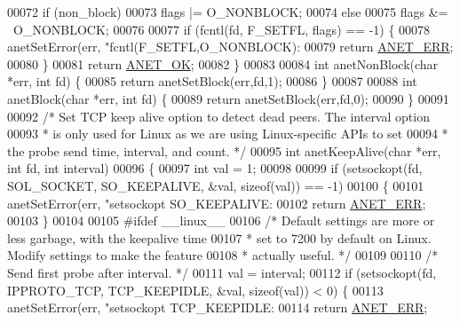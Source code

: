 \begin{DoxyCode}
{00072     \textcolor{keywordflow}{if} (non\_block)
00073         flags |= O\_NONBLOCK;
00074     \textcolor{keywordflow}{else}
00075         flags &= ~O\_NONBLOCK;
00076 
00077     \textcolor{keywordflow}{if} (fcntl(fd, F\_SETFL, flags) == -1) \{
00078         anetSetError(err, \textcolor{stringliteral}{"fcntl(F\_SETFL,O\_NONBLOCK): %
00079         \textcolor{keywordflow}{return} \hyperlink{anet_8h_a0697b7774a7e0f4ef141839fe93536fe}{ANET\_ERR};
00080     \}
00081     \textcolor{keywordflow}{return} \hyperlink{anet_8h_a25fb91ccc6457153f6d2e21380d4c6cf}{ANET\_OK};
00082 \}
00083 
00084 \textcolor{keywordtype}{int} anetNonBlock(\textcolor{keywordtype}{char} *err, \textcolor{keywordtype}{int} fd) \{
00085     \textcolor{keywordflow}{return} anetSetBlock(err,fd,1);
00086 \}
00087 
00088 \textcolor{keywordtype}{int} anetBlock(\textcolor{keywordtype}{char} *err, \textcolor{keywordtype}{int} fd) \{
00089     \textcolor{keywordflow}{return} anetSetBlock(err,fd,0);
00090 \}
00091 
00092 \textcolor{comment}{/* Set TCP keep alive option to detect dead peers. The interval option}
00093 \textcolor{comment}{ * is only used for Linux as we are using Linux-specific APIs to set}
00094 \textcolor{comment}{ * the probe send time, interval, and count. */}
00095 \textcolor{keywordtype}{int} anetKeepAlive(\textcolor{keywordtype}{char} *err, \textcolor{keywordtype}{int} fd, \textcolor{keywordtype}{int} interval)
00096 \{
00097     \textcolor{keywordtype}{int} val = 1;
00098 
00099     \textcolor{keywordflow}{if} (setsockopt(fd, SOL\_SOCKET, SO\_KEEPALIVE, &val, \textcolor{keyword}{sizeof}(val)) == -1)
00100     \{
00101         anetSetError(err, \textcolor{stringliteral}{"setsockopt SO\_KEEPALIVE: %
00102         \textcolor{keywordflow}{return} \hyperlink{anet_8h_a0697b7774a7e0f4ef141839fe93536fe}{ANET\_ERR};
00103     \}
00104 
00105 \textcolor{preprocessor}{#}\textcolor{preprocessor}{ifdef} \_\_linux\_\_
00106     \textcolor{comment}{/* Default settings are more or less garbage, with the keepalive time}
00107 \textcolor{comment}{     * set to 7200 by default on Linux. Modify settings to make the feature}
00108 \textcolor{comment}{     * actually useful. */}
00109 
00110     \textcolor{comment}{/* Send first probe after interval. */}
00111     val = interval;
00112     \textcolor{keywordflow}{if} (setsockopt(fd, IPPROTO\_TCP, TCP\_KEEPIDLE, &val, \textcolor{keyword}{sizeof}(val)) < 0) \{
00113         anetSetError(err, \textcolor{stringliteral}{"setsockopt TCP\_KEEPIDLE: %
00114         \textcolor{keywordflow}{return} \hyperlink{anet_8h_a0697b7774a7e0f4ef141839fe93536fe}{ANET\_ERR};
}}}}
\end{DoxyCode}
